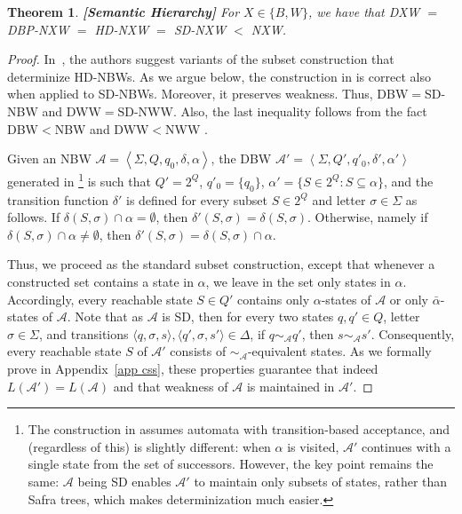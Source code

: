 \documentclass[10pt,a4paper]{amsart}
\newtheorem{thm}{Theorem}[section]
\theoremstyle{definition}
\numberwithin{equation}{section}
\newcommand{\A}{{\mathcal A}}
\newcommand{\zug}[1]{\left\langle #1 \right\rangle}
\begin{document}
\begin{thm}{\bf [Semantic Hierarchy]} 
\label{sem hie}
	For $X \in \{B,W\}$, we have that {\rm DXW} $=$ {\rm DBP-NXW} $=$ {\rm HD-NXW} $=$ {\rm SD-NXW} $<$ {\rm NXW}.
\end{thm}



\begin{proof}
	In~\cite{KSV06,KS15}, the authors suggest variants of the subset construction that determinize HD-NBWs. 
	As we argue below, the construction in \cite{KS15} is correct also when applied to SD-NBWs. Moreover, it preserves weakness.  Thus, DBW$=$SD-NBW and DWW$=$SD-NWW. Also, the last inequality follows from the fact DBW$<$NBW and DWW$<$NWW \cite{Lan69}. 
	
	Given an NBW $\A = \zug{\Sigma, Q, q_0, \delta, \alpha}$, the DBW $\A' = \zug{\Sigma, Q', q'_0, \delta', \alpha'}$ generated in \cite{KS15}\footnote{The construction in \cite{KS15} assumes automata with transition-based acceptance, and (regardless of this) is slightly different: when $\alpha$ is visited, $\A'$ continues with a single state from the set of successors. However, the key point remains the same: $\A$ being SD enables $\A'$ to maintain only subsets of states, rather than Safra trees, which makes determinization much easier.} is such that $Q'=2^Q$, $q'_0= \{q_0\}$, $\alpha' = \{S\in 2^Q: S\subseteq \alpha\}$, and the transition function $\delta'$ is defined for every subset $S\in 2^Q$ and letter $\sigma\in \Sigma$ as follows. If $\delta(S, \sigma)\cap \alpha = \emptyset$, then $\delta'(S, \sigma)=\delta(S, \sigma)$. Otherwise, namely if $\delta(S, \sigma)\cap \alpha \neq \emptyset$, then $\delta'(S, \sigma)=\delta(S, \sigma) \cap \alpha$. 

Thus, we proceed as the standard subset construction, except that whenever a constructed set contains a state in $\alpha$, we leave in the set only states in $\alpha$. Accordingly, every reachable state $S\in Q'$ contains only $\alpha$-states of $\A$ or only $\bar{\alpha}$-states of $\A$. Note that as $\A$ is SD, then for every two states  $q,q' \in Q$, letter $\sigma\in \Sigma$, and transitions $\langle q, \sigma, s\rangle,\langle q', \sigma, s'\rangle \in \Delta$, if $q \sim_{\A} q'$, then $s \sim_{\A} s'$. Consequently, every reachable state $S$ of $\A'$ consists of $\sim_\A$-equivalent states. As we formally prove in Appendix~\ref{app css}, these properties guarantee that indeed $L(\A')=L(\A)$ and that weakness of $\A$ is maintained in $\A'$. 
\end{proof}
\end{document}
